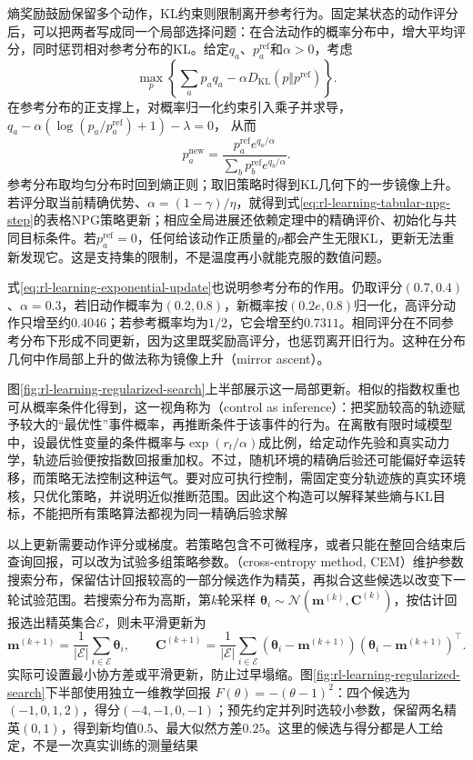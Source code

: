 熵奖励鼓励保留多个动作，KL约束则限制离开参考行为。固定某状态的动作评分后，可以把两者写成同一个局部选择问题：在合法动作的概率分布中，增大平均评分，同时惩罚相对参考分布的KL。给定$q_a$、$p_a^{\mathrm{ref}}$和$\alpha>0$，考虑
\[
  \max_p\left\{\sum_a p_a q_a
          -\alpha D_{\mathrm{KL}}(p\Vert p^{\mathrm{ref}})\right\}.
\]
在参考分布的正支撑上，对概率归一化约束引入乘子并求导，
$q_a-\alpha(\log(p_a/p_a^{\mathrm{ref}})+1)-\lambda=0$，
从而
\begin{equation}
  p_a^{\mathrm{new}}
     =\frac{p_a^{\mathrm{ref}}e^{q_a/\alpha}}
            {\sum_b p_b^{\mathrm{ref}}e^{q_b/\alpha}}.
  \label{eq:rl-learning-exponential-update}
\end{equation}
参考分布取均匀分布时回到熵正则；取旧策略时得到KL几何下的一步镜像上升。若评分取当前精确优势、$\alpha=(1-\gamma)/\eta$，就得到式\eqref{eq:rl-learning-tabular-npg-step}的表格NPG策略更新；相应全局进展还依赖定理中的精确评价、初始化与共同目标条件。若$p_a^{\mathrm{ref}}=0$，任何给该动作正质量的$p$都会产生无限KL，更新无法重新发现它。这是支持集的限制，不是温度再小就能克服的数值问题。

式\eqref{eq:rl-learning-exponential-update}也说明参考分布的作用。仍取评分$(0.7,0.4)$、$\alpha=0.3$，若旧动作概率为$(0.2,0.8)$，新概率按$(0.2e,0.8)$归一化，高评分动作只增至约$0.4046$；若参考概率均为$1/2$，它会增至约$0.7311$。相同评分在不同参考分布下形成不同更新，因为这里既奖励高评分，也惩罚离开旧行为。这种在分布几何中作局部上升的做法称为镜像上升（mirror ascent）。

图\ref{fig:rl-learning-regularized-search}上半部展示这一局部更新。相似的指数权重也可从概率条件化得到，这一视角称为（control as inference）：把奖励较高的轨迹赋予较大的“最优性”事件概率，再推断条件于该事件的行为。在离散有限时域模型中，设最优性变量的条件概率与$\exp(r_t/\alpha)$成比例，给定动作先验和真实动力学，轨迹后验便按指数回报重加权。不过，随机环境的精确后验还可能偏好幸运转移，而策略无法控制这种运气。要对应可执行控制，需固定变分轨迹族的真实环境核，只优化策略，并说明近似推断范围。因此这个构造可以解释某些熵与KL目标，不能把所有策略算法都视为同一精确后验求解

以上更新需要动作评分或梯度。若策略包含不可微程序，或者只能在整回合结束后查询回报，可以改为试验多组策略参数。（cross-entropy method, CEM）维护参数搜索分布，保留估计回报较高的一部分候选作为精英，再拟合这些候选以改变下一轮试验范围。若搜索分布为高斯，第$k$轮采样
$\bm\theta_i\sim\mathcal N(\bm m^{(k)},\bm C^{(k)})$，按估计回报选出精英集合$\mathcal E$，则未平滑更新为
\[
  \bm m^{(k+1)}
       =\frac1{|\mathcal E|}\sum_{i\in\mathcal E}\bm\theta_i,
  \qquad
  \bm C^{(k+1)}
       =\frac1{|\mathcal E|}\sum_{i\in\mathcal E}
       (\bm\theta_i-\bm m^{(k+1)})
       (\bm\theta_i-\bm m^{(k+1)})^\top.
\]
实际可设置最小协方差或平滑更新，防止过早塌缩。图\ref{fig:rl-learning-regularized-search}下半部使用独立一维教学回报
$F(\theta)=-(\theta-1)^2$：四个候选为$(-1,0,1,2)$，得分$(-4,-1,0,-1)$；预先约定并列时选较小参数，保留两名精英$(0,1)$，得到新均值$0.5$、最大似然方差$0.25$。这里的候选与得分都是人工给定，不是一次真实训练的测量结果

